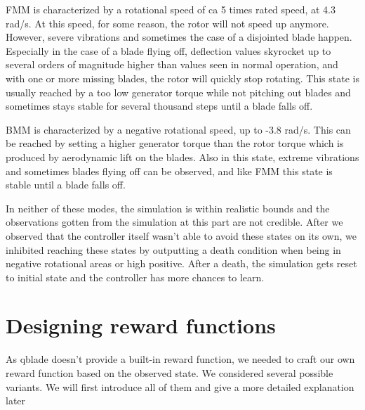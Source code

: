 \documentclass[hyperref,german,beleg]{cgvpub}
\begin{document}
\ac{FMM} is characterized by a rotational speed of ca 5 times rated speed, at 4.3 rad/s. At this speed, for some reason, the rotor will not speed up anymore. However, severe vibrations and sometimes the case of a disjointed blade happen. Especially in the case of a blade flying off, deflection values skyrocket up to several orders of magnitude higher than values seen in normal operation, and with one or more missing blades, the rotor will quickly stop rotating. This state is usually reached by a too low generator torque while not pitching out blades and sometimes stays stable for several thousand steps until a blade falls off.

\ac{BMM} is characterized by a negative rotational speed, up to -3.8 rad/s. This can be reached by setting a higher generator torque than the rotor torque which is produced by aerodynamic lift on the blades. Also in this state, extreme vibrations and sometimes blades flying off can be observed, and like \ac{FMM} this state is stable until a blade falls off. 

In neither of these modes, the simulation is within realistic bounds and the observations gotten from the simulation at this part are not credible. After we observed that the controller itself wasn't able to avoid these states on its own, we inhibited reaching these states by outputting a death condition when being in negative rotational areas or high positive. After a death, the simulation gets reset to initial state and the controller has more chances to learn.


\section{Designing reward functions}
\label{rewardfunctions}

As qblade doesn't provide a built-in reward function, we needed to craft our own reward function based on the observed state. We considered several possible variants. We will first introduce all of them and give a more detailed explanation later
\end{document}
